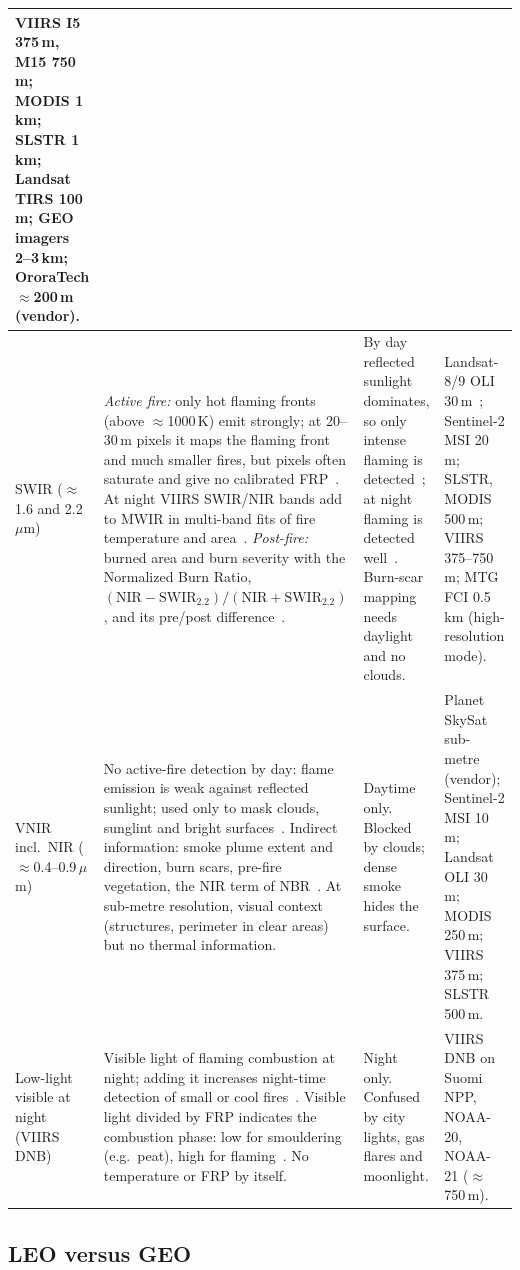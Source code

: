 \documentclass[11pt]{article}
\begin{document}
\begin{longtable}{|p{}|p{}|p{}|p{}|}
VIIRS I5 375\,m, M15 750\,m; MODIS 1\,km; SLSTR 1\,km; Landsat TIRS 100\,m; GEO imagers 2--3\,km; OroraTech $\approx$200\,m (vendor). \\
\hline
SWIR ($\approx$1.6 and 2.2\,$\mu$m) &
\emph{Active fire:} only hot flaming fronts (above $\approx$1000\,K) emit strongly; at 20--30\,m pixels it maps the flaming front and much smaller fires, but pixels often saturate and give no calibrated FRP~\cite{schroeder2016landsat}. At night VIIRS SWIR/NIR bands add to MWIR in multi-band fits of fire temperature and area~\cite{elvidge2013nightfire}. \emph{Post-fire:} burned area and burn severity with the Normalized Burn Ratio, $(\mathrm{NIR}-\mathrm{SWIR}_{2.2})/(\mathrm{NIR}+\mathrm{SWIR}_{2.2})$, and its pre/post difference~\cite{keybenson2006}. &
By day reflected sunlight dominates, so only intense flaming is detected~\cite{schroeder2016landsat}; at night flaming is detected well~\cite{elvidge2013nightfire}. Burn-scar mapping needs daylight and no clouds. &
Landsat-8/9 OLI 30\,m~\cite{schroeder2016landsat}; Sentinel-2 MSI 20\,m; SLSTR, MODIS 500\,m; VIIRS 375--750\,m; MTG FCI 0.5\,km (high-resolution mode). \\
\hline
VNIR incl.\ NIR ($\approx$0.4--0.9\,$\mu$m) &
No active-fire detection by day: flame emission is weak against reflected sunlight; used only to mask clouds, sunglint and bright surfaces~\cite{justice2002modis,schroeder2016landsat}. Indirect information: smoke plume extent and direction, burn scars, pre-fire vegetation, the NIR term of NBR~\cite{keybenson2006}. At sub-metre resolution, visual context (structures, perimeter in clear areas) but no thermal information. &
Daytime only. Blocked by clouds; dense smoke hides the surface. &
Planet SkySat sub-metre (vendor); Sentinel-2 MSI 10\,m; Landsat OLI 30\,m; MODIS 250\,m; VIIRS 375\,m; SLSTR 500\,m. \\
\hline
Low-light visible at night (VIIRS DNB) &
Visible light of flaming combustion at night; adding it increases night-time detection of small or cool fires~\cite{polivka2016dnb}. Visible light divided by FRP indicates the combustion phase: low for smouldering (e.g.\ peat), high for flaming~\cite{wang2020dnb}. No temperature or FRP by itself. &
Night only. Confused by city lights, gas flares and moonlight. &
VIIRS DNB on Suomi NPP, NOAA-20, NOAA-21 ($\approx$750\,m). \\
\end{longtable}

\subsection{LEO versus GEO}
\end{document}
